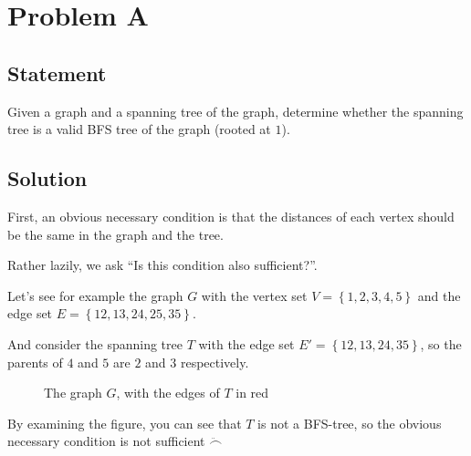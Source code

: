 \section{Problem A}
	\subsection{Statement}
        Given a graph and a spanning tree of the graph, determine whether the spanning tree is a valid BFS
        tree of the graph (rooted at $1$).

	\subsection{Solution}
        First, an obvious necessary condition is that the distances of each vertex should be the same in the graph
        and the tree.

        Rather lazily, we ask ``Is this condition also sufficient?''.

        Let's see for example the graph $G$ with the vertex set
        $V = \left\{1, 2, 3, 4, 5\right\}$ and the edge set 
        $E = \left\{12, 13, 24, 25, 35\right\}$.

        And consider the spanning tree $T$ with the edge set
        $E' = \left\{12, 13, 24, 35\right\}$, so the parents
        of $4$ and $5$ are $2$ and $3$ respectively.

        \begin{figure}[h]
        \centering
        \caption{The graph $G$, with the edges of $T$ in red} \label{Fig1}
        \end{figure}

        By examining the figure, you can see that $T$ is not a BFS-tree, so the obvious necessary
        condition is not sufficient $\ddot\smallfrown$